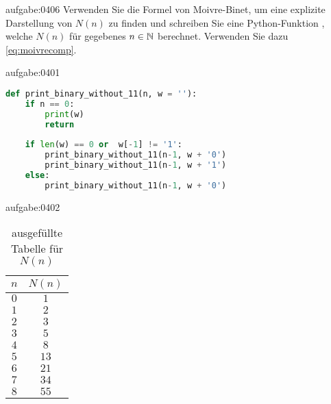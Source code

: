 \begin{aufgabe}{aufgabe:0406}
Verwenden Sie die Formel von Moivre-Binet, um eine explizite Darstellung von $N(n)$ zu finden und schreiben Sie eine Python-Funktion , welche $N(n)$ für gegebenes $n\in\mathbb{N}$ berechnet. Verwenden Sie dazu \cref{eq:moivrecomp}.
\end{aufgabe}

\begin{antwort}{aufgabe:0401}
\begin{lstlisting}[language=Python,caption=binäre Strings ohne $11$]
def print_binary_without_11(n, w = ''):
    if n == 0:
        print(w)
        return
    
    if len(w) == 0 or  w[-1] != '1':
        print_binary_without_11(n-1, w + '0')
        print_binary_without_11(n-1, w + '1')
    else:
        print_binary_without_11(n-1, w + '0')
\end{lstlisting}
\end{antwort}

\begin{antwort}{aufgabe:0402}
    \begin{table}[H]
        \begin{center}
        \begin{tabular}{c|c}
        $n$ & $N(n)$ \\ \hline
        $0$ & $1$ \\
        $1$ & $2$ \\ 
        $2$ & $3$ \\
        $3$ & $5$ \\
        $4$ & $8$ \\
        $5$ & $13$ \\ 
        $6$ & $21$ \\
        $7$ & $34$ \\
        $8$ & $55$ \\
        \end{tabular}
        \end{center}
        \caption{ausgefüllte Tabelle für $N(n)$}
        \label{table:Nncompleted}
    \end{table}
\end{antwort}


